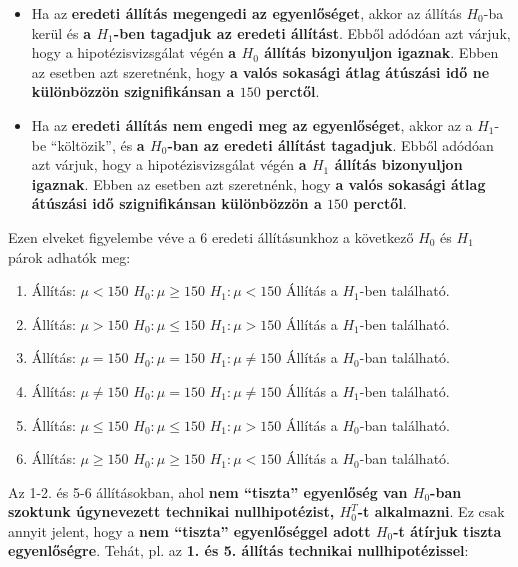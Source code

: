 \documentclass[
]{book}
\providecommand{\tightlist}{%
  \setlength{\itemsep}{0pt}\setlength{\parskip}{0pt}}
\begin{document}
\begin{itemize}
\tightlist
\item
  Ha az \textbf{eredeti állítás megengedi az egyenlőséget}, akkor az állítás \(H_0\)-ba kerül és \textbf{a \(H_1\)-ben tagadjuk az eredeti állítást}. Ebből adódóan azt várjuk, hogy a hipotézisvizsgálat végén \textbf{a \(H_0\) állítás bizonyuljon igaznak}. Ebben az esetben azt szeretnénk, hogy \textbf{a valós sokasági átlag átúszási idő ne különbözzön szignifikánsan a \(150\) perctől}.
\item
  Ha az \textbf{eredeti állítás nem engedi meg az egyenlőséget}, akkor az a \(H_1\)-be ``költözik'', és \textbf{a \(H_0\)-ban az eredeti állítást tagadjuk}. Ebből adódóan azt várjuk, hogy a hipotézisvizsgálat végén \textbf{a \(H_1\) állítás bizonyuljon igaznak}. Ebben az esetben azt szeretnénk, hogy \textbf{a valós sokasági átlag átúszási idő szignifikánsan különbözzön a \(150\) perctől}.
\end{itemize}

Ezen elveket figyelembe véve a \(6\) eredeti állításunkhoz a következő \(H_0\) és \(H_1\) párok adhatók meg:

\begin{enumerate}
\def\labelenumi{\arabic{enumi}.}
\tightlist
\item
  Állítás: \(\mu < 150\) \textbar\textbar{} \(H_0:\mu \geq 150\) \textbar\textbar{} \(H_1:\mu < 150\) \textbar\textbar{} Állítás a \(H_1\)-ben található.
\item
  Állítás: \(\mu > 150\) \textbar\textbar{} \(H_0:\mu \leq 150\) \textbar\textbar{} \(H_1:\mu > 150\) \textbar\textbar{} Állítás a \(H_1\)-ben található.
\item
  Állítás: \(\mu = 150\) \textbar\textbar{} \(H_0:\mu = 150\) \textbar\textbar{} \(H_1:\mu \neq 150\) \textbar\textbar{} Állítás a \(H_0\)-ban található.
\item
  Állítás: \(\mu \neq 150\) \textbar\textbar{} \(H_0:\mu = 150\) \textbar\textbar{} \(H_1:\mu \neq 150\) \textbar\textbar{} Állítás a \(H_1\)-ben található.
\item
  Állítás: \(\mu \leq 150\) \textbar\textbar{} \(H_0:\mu \leq 150\) \textbar\textbar{} \(H_1:\mu > 150\) \textbar\textbar{} Állítás a \(H_0\)-ban található.
\item
  Állítás: \(\mu \geq 150\) \textbar\textbar{} \(H_0:\mu \geq 150\) \textbar\textbar{} \(H_1:\mu < 150\) \textbar\textbar{} Állítás a \(H_0\)-ban található.
\end{enumerate}

Az 1-2. és 5-6 állításokban, ahol \textbf{nem ``tiszta'' egyenlőség van \(H_0\)-ban szoktunk úgynevezett technikai nullhipotézist, \(H_0^T\)-t alkalmazni}. Ez csak annyit jelent, hogy a \textbf{nem ``tiszta'' egyenlőséggel adott \(H_0\)-t átírjuk tiszta egyenlőségre}.
Tehát, pl. az \textbf{1. és 5. állítás technikai nullhipotézissel}:
\end{document}
